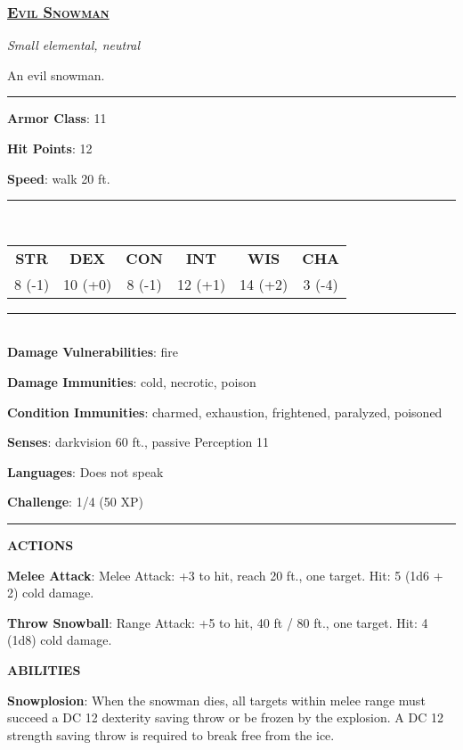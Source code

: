 \subsubsection*{\underline{\textsc{\Large Evil Snowman}}}
\noindent\emph{Small elemental, neutral}

An evil snowman.

\noindent\rule{0.5\textwidth}{0.5pt}

\noindent\textbf{Armor Class}: 11

\noindent\textbf{Hit Points}: 12

\noindent\textbf{Speed}: walk 20 ft.

\noindent\rule{0.5\textwidth}{0.5pt} \\
\begin{table}[H]
	\begin{tabular}{cccccc}
		\textbf{STR} & \textbf{DEX} & \textbf{CON} & \textbf{INT} & \textbf{WIS} & \textbf{CHA} \\
		8 (-1) & 10 (+0) & 8 (-1) & 12 (+1) & 14 (+2) & 3 (-4) \\
	\end{tabular}
\end{table}
\noindent\rule{0.5\textwidth}{0.5pt} \\

\noindent\textbf{Damage Vulnerabilities}: fire

\noindent\textbf{Damage Immunities}: cold, necrotic, poison

\noindent\textbf{Condition Immunities}: charmed, exhaustion, frightened, paralyzed, poisoned

\noindent\textbf{Senses}: darkvision 60 ft., passive Perception 11

\noindent\textbf{Languages}: Does not speak

\noindent\textbf{Challenge}: 1/4 (50 XP)

\noindent\rule{0.5\textwidth}{0.5pt}

\noindent\textbf{ACTIONS}

\noindent\textbf{Melee Attack}: Melee Attack: +3 to hit, reach 20 ft., one target. Hit: 5 (1d6 + 2) cold damage.

\noindent\textbf{Throw Snowball}: Range Attack: +5 to hit, 40 ft / 80 ft., one target. Hit: 4 (1d8) cold damage.

\noindent\textbf{ABILITIES}

\noindent\textbf{Snowplosion}: When the snowman dies, all targets within melee range must succeed a DC 12 dexterity saving throw or be frozen by the explosion. A DC 12 strength saving throw is required to break free from the ice.